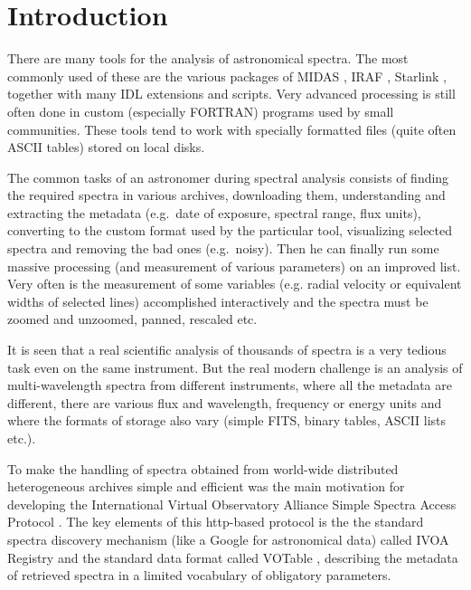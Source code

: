 \documentclass[final,authoryear,5p,times,twocolumn]{elsarticle}
\begin{document}

\newcommand{\qjras}{QJRAS}
\newcommand{\apj}{ApJ}
\newcommand{\aap}{A\&A}
\newcommand{\aspconf}{ASP Conf.\ Ser.}

\newcommand{\ascl}[1]{\href{http://www.ascl.net/#1}{ascl:#1}}

\section{Introduction}

There are many tools for the analysis of astronomical spectra.  The most
commonly used of these are the various packages of MIDAS
\citep[][\ascl{1302.017}]{1992ASPC...25..115W}, IRAF
\citep[][\ascl{9911.002}]{2012ASPC..461..595F}, Starlink
\citep[][\ascl{1110.012}]{1982QJRAS..23..485D}, together with many IDL
extensions and scripts. Very advanced processing is still often done in custom
(especially FORTRAN) programs used by small communities.  These tools tend to
work with specially formatted files (quite often ASCII tables) stored on local
disks.

The common tasks of an astronomer during spectral analysis consists of finding
the required spectra in various archives, downloading them, understanding and
extracting the metadata (e.g.\ date of exposure, spectral range, flux units),
converting to the custom format used by the particular tool, visualizing
selected spectra and  removing the bad ones (e.g.\ noisy). Then he can finally
run some massive processing (and measurement of various parameters) on an
improved list.  Very often is the measurement of some variables (e.g. radial
velocity or equivalent widths of selected lines) accomplished interactively
and the spectra must be zoomed and unzoomed, panned, rescaled etc.

It is seen that a real scientific analysis of thousands of spectra is a very
tedious task even on the same instrument. But the real modern challenge is an
analysis of multi-wavelength spectra from different instruments, where all the
metadata are different, there are various flux and wavelength, frequency or
energy units  and where the formats of storage also vary (simple FITS, binary
tables, ASCII lists etc.).

To make the handling of spectra obtained from world-wide distributed
heterogeneous archives simple and efficient was the main motivation for
developing the International Virtual Observatory Alliance Simple Spectra
Access Protocol \citep[IVOA SSAP;][]{ssap}. The key elements of this
http-based protocol is the the standard spectra discovery mechanism (like a
Google for astronomical data) called IVOA Registry \citep{registry} and  the
standard data format called VOTable \citep{2004tivo.conf..118O},
describing the metadata of retrieved spectra in a limited vocabulary of
obligatory parameters.
\end{document}
